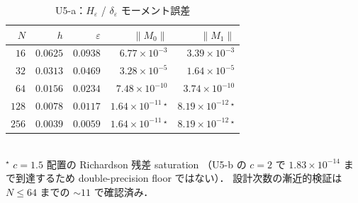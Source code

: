 \begin{table}[!ht]
\caption{U5-a：\texorpdfstring{$H_\varepsilon$ / $\delta_\varepsilon$}{Heps / deltaeps} モーメント誤差}
\label{tab:U5_moments}
\centering\small
\begin{tabular}{r r r r r}
\toprule
$N$ & $h$ & $\varepsilon$ & $\|M_0\|$ & $\|M_1\|$ \\
\midrule
$16$  & $0.0625$  & $0.0938$  & $6.77\times 10^{-3}$ & $3.39\times 10^{-3}$ \\
$32$  & $0.0313$  & $0.0469$  & $3.28\times 10^{-5}$ & $1.64\times 10^{-5}$ \\
$64$  & $0.0156$  & $0.0234$  & $7.48\times 10^{-10}$ & $3.74\times 10^{-10}$ \\
$128$ & $0.0078$  & $0.0117$  & $1.64\times 10^{-11}\,^\star$ & $8.19\times 10^{-12}\,^\star$ \\
$256$ & $0.0039$  & $0.0059$  & $1.64\times 10^{-11}\,^\star$ & $8.19\times 10^{-12}\,^\star$ \\
\bottomrule
\end{tabular}
\\[2pt]
{\footnotesize $^\star$ $c=1.5$ 配置の Richardson 残差 saturation
（U5-b の $c=2$ で $1.83\times 10^{-14}$ まで到達するため double-precision floor ではない）．
設計次数の漸近的検証は $N \le 64$ までの $\sim 11$ で確認済み．}
\end{table}

